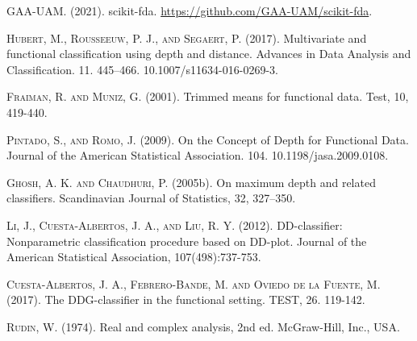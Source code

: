 \documentclass[a4paper,oneside,11pt,leqno]{article}
\begin{document}
\begin{enumerate}
\begin{thebibliography}{10}
                  \textsc{GAA-UAM.} (2021). scikit-fda. \url{https://github.com/GAA-UAM/scikit-fda}.

                  \textsc{Hubert, M., Rousseeuw, P. J., and Segaert, P.} (2017).
                  Multivariate and functional classification using depth and distance.
                  Advances in Data Analysis and Classification. 11. 445–466. 10.1007/s11634-016-0269-3.

                  \textsc{Fraiman, R. and Muniz, G.} (2001). Trimmed means for functional
                  data. Test, 10, 419-440.

                  \textsc{Pintado, S., and Romo, J.} (2009). On the Concept of Depth for Functional Data.
                  Journal of the American Statistical Association. 104. 10.1198/jasa.2009.0108.

                  \textsc{Ghosh, A. K. and Chaudhuri, P.} (2005b). On maximum depth and
                  related classifiers. Scandinavian Journal of Statistics, 32, 327–350.

                  \textsc{Li, J., Cuesta-Albertos, J. A., and Liu, R. Y.} (2012).
                  DD-classifier: Nonparametric classification procedure based on DD-plot.
                  Journal of the American Statistical Association, 107(498):737-753.

                  \textsc{Cuesta-Albertos, J. A., Febrero-Bande, M. and Oviedo de la Fuente, M.}
                  (2017). The DDG-classifier in the functional setting. TEST, 26. 119-142.

                  \textsc{Rudin, W.} (1974).
                  Real and complex analysis, 2nd ed. McGraw-Hill, Inc., USA.

            \end{thebibliography}


\end{enumerate}
\end{document}
